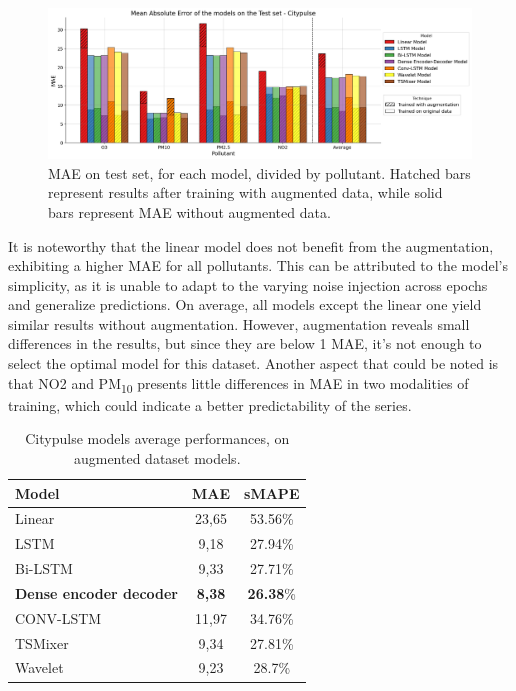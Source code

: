 \begin{figure}[h]
    \centering
    \includegraphics[width=1\linewidth]{images/Results/Aarhus_results.png}
    \caption{MAE on test set, for each model, divided by pollutant. Hatched bars represent results after training with augmented data, while solid bars represent MAE without augmented data.}
    \label{fig:aarhus_results}
\end{figure}

It is noteworthy that the linear model does not benefit from the augmentation, exhibiting a higher MAE for all pollutants. This can be attributed to the model's simplicity, as it is unable to adapt to the varying noise injection across epochs and generalize predictions. On average, all models except the linear one yield similar results without augmentation. However, augmentation reveals small differences in the results, but since they are below 1 MAE, it's not enough to select the optimal model for this dataset.
Another aspect that could be noted is that NO2 and PM\textsubscript{10} presents little differences in MAE in two modalities of training, which could indicate a better predictability of the series.

\begin{table}[h]
    \centering
    \begin{tabular}{lcc}
        \toprule
        \textbf{Model} & \textbf{MAE} & \textbf{sMAPE} \\ 
        \midrule
        Linear & 23,65 & 53.56\% \\
        LSTM & 9,18 & 27.94\% \\
        Bi-LSTM & 9,33 & 27.71\% \\
        \textbf{Dense encoder decoder} & \textbf{8,38} & \textbf{26.38}\% \\
        CONV-LSTM & 11,97 & 34.76\% \\
        TSMixer & 9,34 & 27.81\% \\
        Wavelet & 9,23 & 28.7\% \\ 
        \bottomrule
        \end{tabular}
        \caption{Citypulse models average performances, on augmented dataset models.}
        \label{tab:Citypulse performances}
\end{table}


